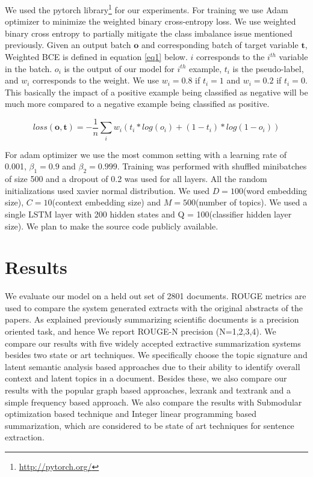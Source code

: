 We used the pytorch library\footnote{\url{http://pytorch.org/}} for our experiments. For training we use Adam optimizer to minimize the weighted binary cross-entropy loss. We use weighted binary cross entropy to partially mitigate the class imbalance issue mentioned previously. Given an output batch $\boldsymbol{o}$ and corresponding batch of target variable $\boldsymbol{t}$, Weighted BCE is defined in equation \ref{eq1} below. $i$ corresponds to the $i^{th}$ variable in the batch. $o_i$ is the output of our model for $i^{th}$ example, $t_i$ is the pseudo-label, and $w_i$ corresponds to the weight. We use $w_i = 0.8$ if $t_i = 1$ and $w_i = 0.2$ if $t_i = 0$. This basically the impact of a positive example being classified as negative will be much more compared to a negative example being classified as positive.
 
\begin{equation}
loss(\boldsymbol{o},\boldsymbol{t}) = -\frac{1}{n} \sum\limits_{i}w_i(t_i*log(o_i) + (1-t_i)*log(1-o_i))
\label{eq1}
\end{equation}

For adam optimizer we use the most common setting with a learning rate of 0.001, $\beta_1 = 0.9$ and $\beta_2=0.999$. Training was performed with shuffled minibatches of size 500 and a dropout of 0.2 was used for all layers. All the random initializations used xavier normal distribution. We used $D = 100$(word embedding size), $C = 10$(context embedding size) and $M = 500$(number of topics). We used a single LSTM layer with 200 hidden states and Q = 100(classifier hidden layer size). We plan to make the source code publicly available.
 
\section{Results}

We evaluate our model on a held out set of 2801 documents. ROUGE metrics\cite{lin2004rouge} are used to compare the system generated extracts with the original abstracts of the papers. As explained previously summarizing scientific documents is a precision oriented task, and hence We report ROUGE-N precision (N=1,2,3,4). We compare our results with five widely accepted extractive summarization systems besides two state or art techniques. We specifically choose the topic signature\cite{lin2000automated} and latent semantic analysis\cite{steinberger2004using} based approaches due to their ability to identify overall context and latent topics in a document. Besides these, we also compare our results with the popular graph based approaches, lexrank\cite{erkan2004lexrank} and textrank\cite{mihalcea2004textrank} and a simple frequency based approach. We also compare the results with Submodular optimization based technique\cite{lin2012learning} and Integer linear programming based summarization\cite{gillick2009scalable}, which are considered to be state of art techniques for sentence extraction\cite{hong2014repository}.\\

